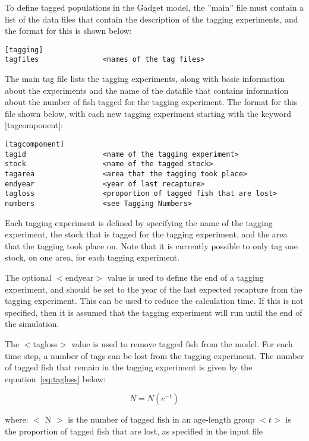 \documentclass[10pt,twoside]{book}
\begin{document}
\bigskip
To define tagged populations in the Gadget model, the ''main'' file must contain a list of the data files that contain the description of the tagging experiments, and the format for this is shown below:

{\small\begin{verbatim}
[tagging]
tagfiles               <names of the tag files>
\end{verbatim}}

The main tag file lists the tagging experiments, along with basic information about the experiments and the name of the datafile that contains information about the number of fish tagged for the tagging experiment.  The format for this file shown below, with each new tagging experiment starting with the keyword [tagcomponent]:

{\small\begin{verbatim}
[tagcomponent]
tagid                  <name of the tagging experiment>
stock                  <name of the tagged stock>
tagarea                <area that the tagging took place>
endyear                <year of last recapture>
tagloss                <proportion of tagged fish that are lost>
numbers                <see Tagging Numbers>
\end{verbatim}}

Each tagging experiment is defined by specifying the name of the tagging experiment, the stock that is tagged for the tagging experiment, and the area that the tagging took place on.  Note that it is currently possible to only tag one stock, on one area, for each tagging experiment.

\bigskip
The optional $<$endyear$>$ value is used to define the end of a tagging experiment, and should be set to the year of the last expected recapture from the tagging experiment.  This can be used to reduce the calculation time.  If this is not specified, then it is assumed that the tagging experiment will run until the end of the simulation.

\bigskip
The $<$tagloss$>$ value is used to remove tagged fish from the model.  For each time step, a number of tags can be lost from the tagging experiment.  The number of tagged fish that remain in the tagging experiment is given by the equation~\ref{eq:tagloss} below:

\begin{equation}\label{eq:tagloss}
N = N (e^{-t})
\end{equation}

where:\newline
$<$ N $>$ is the number of tagged fish in an age-length group\newline
$<t>$ is the proportion of tagged fish that are lost, as specified in the input file
\end{document}
